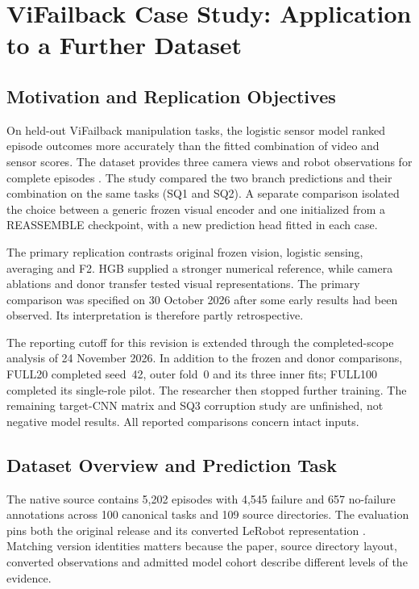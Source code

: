 \chapter{ViFailback Case Study: Application to a Further Dataset}
\label{ch:vifailback}

\section{Motivation and Replication Objectives}
On held-out ViFailback manipulation tasks, the logistic sensor model ranked episode outcomes more accurately than the fitted combination of video and sensor scores. The dataset provides three camera views and robot observations for complete episodes \citep{Zeng2026ViFailback}. The study compared the two branch predictions and their combination on the same tasks (SQ1 and SQ2). A separate comparison isolated the choice between a generic frozen visual encoder and one initialized from a REASSEMBLE checkpoint, with a new prediction head fitted in each case.

The primary replication contrasts original frozen vision, logistic sensing, averaging and F2. HGB supplied a stronger numerical reference, while camera ablations and donor transfer tested visual representations. The primary comparison was specified on 30 October 2026 after some early results had been observed. Its interpretation is therefore partly retrospective.

The reporting cutoff for this revision is extended through the completed-scope analysis of 24 November 2026. In addition to the frozen and donor comparisons, FULL20 completed seed~42, outer fold~0 and its three inner fits; FULL100 completed its single-role pilot. The researcher then stopped further training. The remaining target-CNN matrix and SQ3 corruption study are unfinished, not negative model results. All reported comparisons concern intact inputs.

\section{Dataset Overview and Prediction Task}
The native source contains 5,202 episodes with 4,545 failure and 657 no-failure annotations across 100 canonical tasks and 109 source directories. The evaluation pins both the original release and its converted LeRobot representation \citep{ViFailbackHF2025}. Matching version identities matters because the paper, source directory layout, converted observations and admitted model cohort describe different levels of the evidence.

